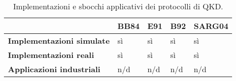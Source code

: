 \begin{table}[h!]
    \centering
    \begin{tabular}{||l | l l l l||} 
        \hline
         & \textbf{BB84} & \textbf{E91} & \textbf{B92} & \textbf{SARG04} \\ \hline
        \textbf{Implementazioni simulate} & sì & sì & sì & sì \\ 
        \textbf{Implementazioni reali} & sì & sì & sì & sì \\ 
        \textbf{Applicazioni industriali} & n/d & n/d & n/d & n/d \\ 
        \hline
    \end{tabular}
    \caption{Implementazioni e sbocchi applicativi dei protocolli di QKD.}
    \label{table:implementazioni}
\end{table}